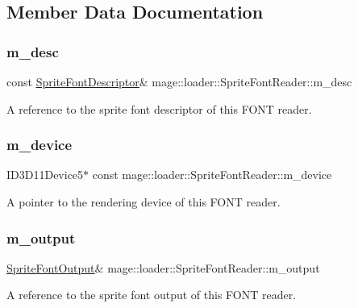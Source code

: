 \subsection{Member Data Documentation}
\hypertarget{classmage_1_1loader_1_1_sprite_font_reader_adf4502be72787c09c6d4b18566fcb906}{}\label{classmage_1_1loader_1_1_sprite_font_reader_adf4502be72787c09c6d4b18566fcb906} 
\subsubsection{\texorpdfstring{m\+\_\+desc}{m\_desc}}
{\footnotesize\ttfamily const \hyperlink{structmage_1_1_sprite_font_descriptor}{Sprite\+Font\+Descriptor}\& mage\+::loader\+::\+Sprite\+Font\+Reader\+::m\+\_\+desc\hspace{0.3cm}{\ttfamily [private]}}

A reference to the sprite font descriptor of this F\+O\+NT reader. \hypertarget{classmage_1_1loader_1_1_sprite_font_reader_ab4e714ca6e00846db7fb312d03c9ecc2}{}\label{classmage_1_1loader_1_1_sprite_font_reader_ab4e714ca6e00846db7fb312d03c9ecc2} 
\subsubsection{\texorpdfstring{m\+\_\+device}{m\_device}}
{\footnotesize\ttfamily I\+D3\+D11\+Device5$\ast$ const mage\+::loader\+::\+Sprite\+Font\+Reader\+::m\+\_\+device\hspace{0.3cm}{\ttfamily [private]}}

A pointer to the rendering device of this F\+O\+NT reader. \hypertarget{classmage_1_1loader_1_1_sprite_font_reader_a818ecabf97163ce3a9b81f67ebfd5799}{}\label{classmage_1_1loader_1_1_sprite_font_reader_a818ecabf97163ce3a9b81f67ebfd5799} 
\subsubsection{\texorpdfstring{m\+\_\+output}{m\_output}}
{\footnotesize\ttfamily \hyperlink{structmage_1_1_sprite_font_output}{Sprite\+Font\+Output}\& mage\+::loader\+::\+Sprite\+Font\+Reader\+::m\+\_\+output\hspace{0.3cm}{\ttfamily [private]}}

A reference to the sprite font output of this F\+O\+NT reader. 